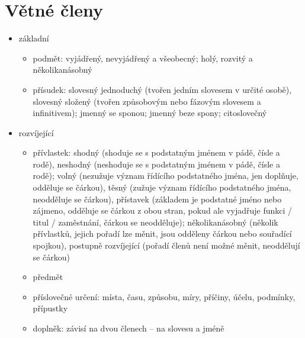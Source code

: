 \documentclass{memoir}
\begin{document}
\section*{Větné členy}
\begin{itemize}
\item základní
\begin{itemize}
\item podmět: vyjádřený, nevyjádřený a všeobecný; holý, rozvitý a několikanásobný
\item přísudek: slovesný jednoduchý (tvořen jedním slovesem v určité osobě), slovesný složený (tvořen způsobovým nebo fázovým slovesem a infinitivem); jmenný se sponou; jmenný beze spony; citoslovečný
\end{itemize}
\item rozvíjející
\begin{itemize}
\item přívlastek: shodný (shoduje se s podstatným jménem v pádě, čísle a rodě), neshodný (neshoduje se s podstatným jménem v pádě, čísle a rodě); volný (nezužuje význam řídícího podstatného jména, jen doplňuje, odděluje se čárkou), těsný (zužuje význam řídícího podstatného jména, neodděluje se čárkou), přístavek (základem je podstatné jméno nebo zájmeno, odděluje se čárkou z obou stran, pokud ale vyjadřuje funkci / titul / zaměstnání, čárkou se neodděluje); několikanásobný (několik přívlastků, jejich pořadí lze měnit, jsou odděleny čárkou nebo souřadící spojkou), postupně rozvíjející (pořadí členů není možné měnit, neoddělují se čárkou)
\item předmět
\item příslovečné určení: místa, času, způsobu, míry, příčiny, účelu, podmínky, přípustky
\item doplněk: závisí na dvou členech -- na slovesu a jméně
\end{itemize}
\end{itemize}
\end{document}
